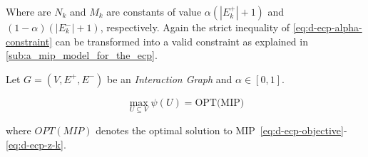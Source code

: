Where are $N_k$ and $M_k$ are constants of value $\alpha (|E_k^{+}| + 1)$ and $(1 -
	\alpha ) ( |E^{-}_k| + 1)$, respectively.
Again the strict inequality of \eqref{eq:d-ecp-alpha-constraint} can be
transformed into a valid constraint as explained in
\autoref{sub:a_mip_model_for_the_ecp}.

\begin{theorem}
	\label{th:d-ecp-mip}
	Let $G = (V, E^{+}, E^{-})$ be an \emph{Interaction Graph} and $\alpha \in
		[0, 1]$.

	\begin{equation}
		\max_{U \subseteq V} \psi(U) = \text{OPT(MIP)}
	\end{equation}

	where $OPT(MIP)$ denotes the optimal solution to
	MIP~\eqref{eq:d-ecp-objective}-\eqref{eq:d-ecp-z-k}.
\end{theorem}


